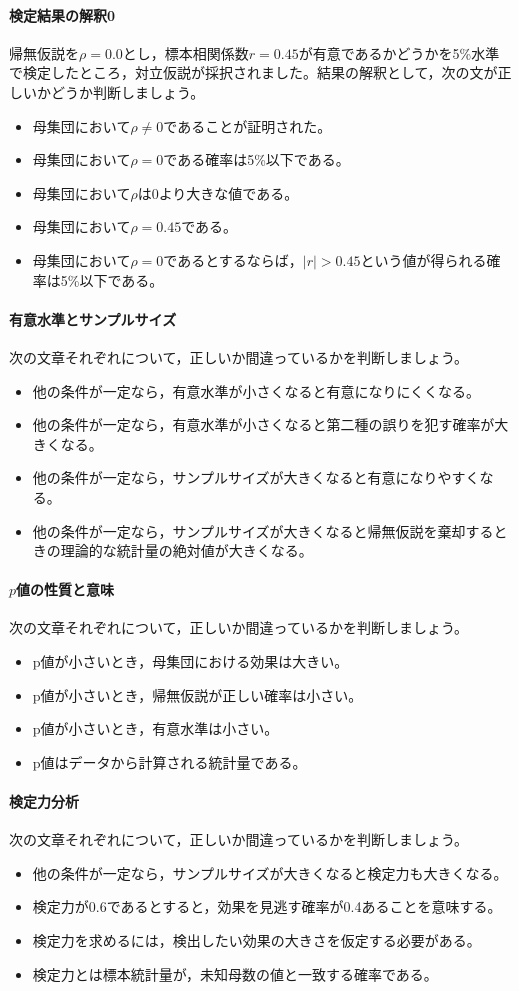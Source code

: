 \documentclass{ltjsarticle}
\begin{document}
\paragraph{検定結果の解釈0}帰無仮説を$\rho=0.0$とし，標本相関係数$r=0.45$が有意であるかどうかを5\%水準で検定したところ，対立仮説が採択されました。結果の解釈として，次の文が正しいかどうか判断しましょう。
\begin{itemize}
    \item 母集団において$\rho\neq 0$であることが証明された。
    \item 母集団において$\rho=0$である確率は5\%以下である。
    \item 母集団において$\rho$は0より大きな値である。
    \item 母集団において$\rho=0.45$である。
    \item 母集団において$\rho=0$であるとするならば，$|r|>0.45$という値が得られる確率は5\%以下である。
\end{itemize}

\paragraph{有意水準とサンプルサイズ}次の文章それぞれについて，正しいか間違っているかを判断しましょう。
\begin{itemize}
    \item 他の条件が一定なら，有意水準が小さくなると有意になりにくくなる。
    \item 他の条件が一定なら，有意水準が小さくなると第二種の誤りを犯す確率が大きくなる。
    \item 他の条件が一定なら，サンプルサイズが大きくなると有意になりやすくなる。
    \item 他の条件が一定なら，サンプルサイズが大きくなると帰無仮説を棄却するときの理論的な統計量の絶対値が大きくなる。
\end{itemize}
\paragraph{$p$値の性質と意味}次の文章それぞれについて，正しいか間違っているかを判断しましょう。
\begin{itemize}
    \item p値が小さいとき，母集団における効果は大きい。
    \item p値が小さいとき，帰無仮説が正しい確率は小さい。
    \item p値が小さいとき，有意水準は小さい。
    \item p値はデータから計算される統計量である。
\end{itemize}
\paragraph{検定力分析}次の文章それぞれについて，正しいか間違っているかを判断しましょう。
\begin{itemize}
    \item 他の条件が一定なら，サンプルサイズが大きくなると検定力も大きくなる。
    \item 検定力が0.6であるとすると，効果を見逃す確率が0.4あることを意味する。
    \item 検定力を求めるには，検出したい効果の大きさを仮定する必要がある。
    \item 検定力とは標本統計量が，未知母数の値と一致する確率である。
\end{itemize}
\end{document}
